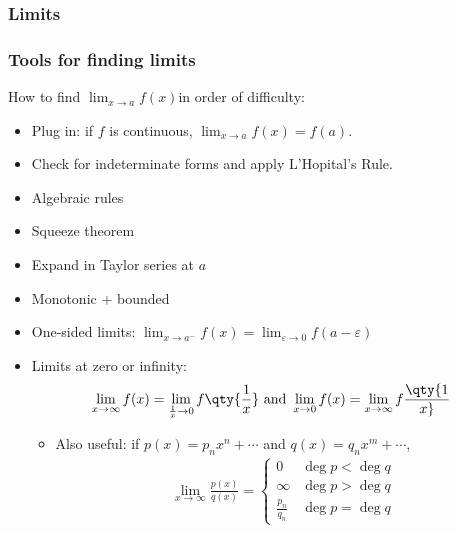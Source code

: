 \hypertarget{limits}{%
\subsubsection{Limits}\label{limits}}

\hypertarget{tools-for-finding-limits}{%
\subsubsection{Tools for finding
limits}\label{tools-for-finding-limits}}


How to find \(\lim_{x\to a} f(x)\)in order of difficulty:

\begin{itemize}
\item
  Plug in: if \(f\) is continuous, \(\lim_{x\to a} f(x) = f(a)\).
\item
  Check for indeterminate forms and apply L'Hopital's Rule.
\item
  Algebraic rules
\item
  Squeeze theorem
\item
  Expand in Taylor series at \(a\)
\item
  Monotonic + bounded
\item
  One-sided limits:
  \(\lim_{x\to a^-} f(x) = \lim_{\varepsilon \to 0} f(a-\varepsilon)\)
\item
  Limits at zero or infinity:
  \begin{align*}
  \lim_{x\to\infty} f(x) = \lim_{\frac{1}{x}\to 0} f\qty{\frac{1}{x}} \text{ and } 
  \lim_{x\to 0} f(x) = \lim_{x\to\infty} f\qty{1 \over x}
  \end{align*}

  \begin{itemize}
  \tightlist
  \item
    Also useful: if \(p(x) = p_nx^n + \cdots\) and
    \(q(x) = q_nx^m + \cdots\),
    \begin{align*}
    \lim_{x\to\infty} \frac{p(x)}{q(x)} = 
    \begin{cases}
    0 & \deg p < \deg q \\
    \infty & \deg p > \deg q \\
    \frac{p_n}{q_n} & \deg p = \deg q
    \end{cases}
    \end{align*}
  \end{itemize}
\end{itemize}

